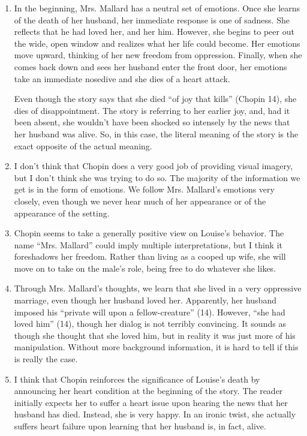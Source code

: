 \documentclass[12pt,letterpaper]{article}
\begin{document}
\begin{enumerate}

\item In the beginning, Mrs. Mallard has a neutral set of emotions.  Once she
learns of the death of her husband, her immediate response is one of sadness.
She reflects that he had loved her, and her him.  However, she begins to peer
out the wide, open window and realizes what her life could become.  Her emotions
move upward, thinking of her new freedom from oppression.  Finally, when she
comes back down and sees her husband enter the front door, her emotions take an
immediate nosedive and she dies of a heart attack.

Even though the story says that she died ``of joy that kills'' (Chopin 14), she
dies of disappointment.  The story is referring to her earlier joy, and, had it
been absent, she wouldn't have been shocked so intensely by the news that her
husband was alive.  So, in this case, the literal meaning of the story is the
exact opposite of the actual meaning.

\item I don't think that Chopin does a very good job of providing visual
imagery, but I don't think she was trying to do so.  The majority of the
information we get is in the form of emotions.  We follow Mrs. Mallard's
emotions very closely, even though we never hear much of her appearance or of
the appearance of the setting.

\item Chopin seems to take a generally positive view on Louise's behavior.  The
name ``Mrs. Mallard'' could imply multiple interpretations, but I think it
foreshadows her freedom.  Rather than living as a cooped up wife, she will move
on to take on the male's role, being free to do whatever she likes.

\item Through Mrs. Mallard's thoughts, we learn that she lived in a very
oppressive marriage, even though her husband loved her.  Apparently, her husband
imposed his ``private will upon a fellow-creature'' (14).  However, ``she had
loved him'' (14), though her dialog is not terribly convincing.  It sounds as
though she thought that she loved him, but in reality it was just more of his
manipulation.  Without more background information, it is hard to tell if this
is really the case.

\item I think that Chopin reinforces the significance of Louise's death by
announcing her heart condition at the beginning of the story.  The reader
initially expects her to suffer a heart issue upon hearing the news that her
husband has died.  Instead, she is very happy.  In an ironic twist, she actually
suffers heart failure upon learning that her husband is, in fact, alive.

\end{enumerate}
\end{document}
